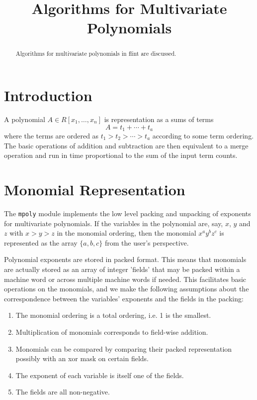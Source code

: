 \documentclass[11pt,reqno]{amsart}
\title{Algorithms for Multivariate Polynomials}
\author{}
\numberwithin{equation}{section}
\begin{document}
\begin{abstract}
Algorithms for multivariate polynomials in flint are discussed.
\end{abstract}


\maketitle

\section{Introduction}

A polynomial $A \in R[x_1,\dots,x_n]$ is representation as a sums of terms
\begin{equation*}
A = t_1 + \cdots + t_a
\end{equation*}
where the terms are ordered as $t_1 > t_2 > \cdots > t_a$ according to some
term ordering. The basic operations of addition and subtraction are then
equivalent to a merge operation and run in time proportional to the sum of the 
input term counts.


\section{Monomial Representation}

The {\tt mpoly} module implements the low level packing and unpacking of
exponents for multivariate polynomials. If the variables in the polynomial are,
say, $x$, $y$ and $z$ with $x > y > z$ in the monomial ordering, then the
monomial $x^a y^b z^c$ is represented as the array $\{a, b, c\}$ from the
user's perspective.

Polynomial exponents are stored in packed format. This means that monomials
are actually stored as an array of integer 'fields' that may be packed within
a machine word or across multiple machine words if needed.
This facilitates basic operations on the monomials, and we make the following
assumptions about the correspondence between the variables' exponents and the
fields in the packing:

\begin{enumerate}
\item {The monomial ordering is a total ordering, i.e. 1 is the smallest.}
\item{Multiplication of monomials corresponds to field-wise addition.}
\item{Monomials can be compared by comparing their packed representation
possibly with an xor mask on certain fields.}
\item{The exponent of each variable is itself one of the fields.}
\item{The fields are all non-negative.}
\end{enumerate}
\end{document}
